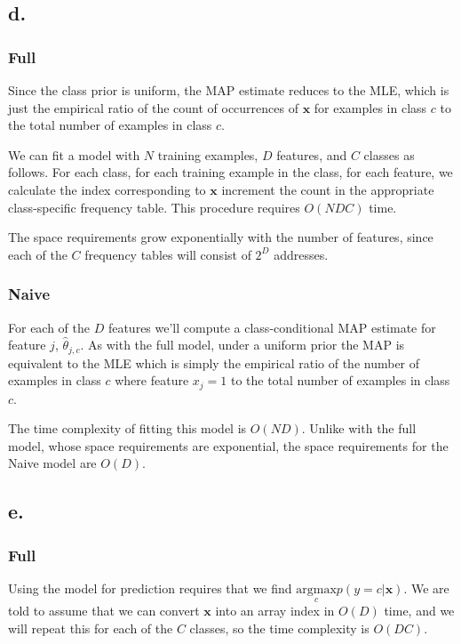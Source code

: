 \documentclass{article}
\begin{document}
\subsection{d.}

\subsubsection{Full}

Since the class prior is uniform, the MAP estimate reduces to the MLE,
which is just the empirical ratio of the count of occurrences of
$\mathbf{x}$ for examples in class $c$ to the total number of examples
in class $c$.

We can fit a model with $N$ training examples, $D$ features, and $C$
classes as follows. For each class, for each training example in the
class, for each feature, we calculate the index corresponding to
$\mathbf{x}$ increment the count in the appropriate class-specific
frequency table. This procedure requires $O(NDC)$ time.

The space requirements grow exponentially with the number of features,
since each of the $C$ frequency tables will consist of $2^D$ addresses.

\subsubsection{Naive}

For each of the $D$ features we'll compute a class-conditional MAP
estimate for feature $j$, $\hat{\theta}_{j,c}$. As with the full
model, under a uniform prior the MAP is equivalent to the MLE which is
simply the empirical ratio of the number of examples in class $c$
where feature $x_j = 1$ to the total number of examples in class $c$.

The time complexity of fitting this model is $O(ND)$. Unlike with the
full model, whose space requirements are exponential, the space
requirements for the Naive model are $O(D)$.

\subsection{e.}

\subsubsection{Full}

Using the model for prediction requires that we find
$\underset{c}{\mathrm{argmax}} p(y=c|\mathbf{x})$. We are told to
assume that we can convert $\mathbf{x}$ into an array index in $O(D)$
time, and we will repeat this for each of the $C$ classes, so the time
complexity is $O(DC)$.
\end{document}
